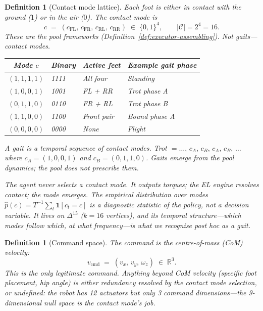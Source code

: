 \documentclass[11pt,a4paper]{article}
\newtheorem{definition}[theorem]{Definition}
\newcommand{\R}{\mathbb{R}}
\newcommand{\cC}{\mathcal{C}}
\begin{document}

\begin{definition}[Contact mode lattice]
\label{def:contact-mode}
Each foot is either in contact with the ground ($1$)
or in the air ($0$).
The \emph{contact mode} is
\begin{equation}\label{eq:contact-mode}
  c \;=\;
  (c_{\mathrm{FL}},\, c_{\mathrm{FR}},\,
   c_{\mathrm{RL}},\, c_{\mathrm{RR}})
  \;\in\; \{0,1\}^4,
  \qquad
  |\cC| = 2^4 = 16.
\end{equation}
These are the pool frameworks
(Definition~\ref{def:executor-assembling}).
Not gaits---contact modes.

\medskip
\begin{center}
\begin{tabular}{@{}clll@{}}
\toprule
\textbf{Mode $c$} & \textbf{Binary}
  & \textbf{Active feet}
  & \textbf{Example gait phase} \\
\midrule
$(1,1,1,1)$ & 1111 & All four & Standing \\
$(1,0,0,1)$ & 1001 & FL + RR  & Trot phase A \\
$(0,1,1,0)$ & 0110 & FR + RL  & Trot phase B \\
$(1,1,0,0)$ & 1100 & Front pair & Bound phase A \\
$(0,0,0,0)$ & 0000 & None     & Flight \\
\bottomrule
\end{tabular}
\end{center}

\medskip\noindent
A \emph{gait} is a temporal sequence of contact modes.
Trot $= \ldots,\, c_A,\, c_B,\, c_A,\, c_B,\, \ldots$
where $c_A = (1,0,0,1)$ and $c_B = (0,1,1,0)$.
Gaits \emph{emerge} from the pool dynamics;
the pool does not prescribe them.

The agent never selects a contact mode.
It outputs torques; the EL engine resolves contact;
the mode \emph{emerges}.
The empirical distribution over modes
$\hat{p}(c) = T^{-1}\sum_{t} \mathbf{1}[c_t = c]$
is a \emph{diagnostic statistic} of the policy,
not a decision variable.
It lives on $\Delta^{15}$ ($k = 16$ vertices),
and its temporal structure---which modes follow which,
at what frequency---is what we recognise post hoc as a gait.
\end{definition}


\begin{definition}[Command space]
\label{def:command-space}
The \emph{command} is the centre-of-mass (CoM) velocity:
\begin{equation}\label{eq:command}
  v_{\mathrm{cmd}}
  \;=\;
  (v_x,\, v_y,\, \omega_z)
  \;\in\; \R^3.
\end{equation}
This is the \emph{only} legitimate command.
Anything beyond CoM velocity
(specific foot placement, hip angle)
is either redundancy resolved by the contact mode
selection, or undefined:
the robot has 12 actuators but only 3 command
dimensions---the 9-dimensional null space is
the contact mode's job.
\end{definition}
\end{document}
